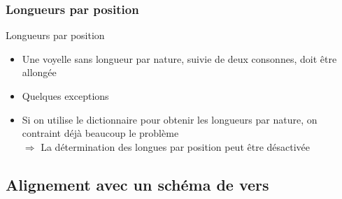 \documentclass{beamer}
\begin{document}
\subsubsection{Longueurs par position}

\begin{frame}{Longueurs par position}

\begin{itemize}
\item Une voyelle sans longueur par nature, suivie de deux consonnes, doit être allongée
\item Quelques exceptions
\vfill
\item Si on utilise le dictionnaire pour obtenir les longueurs par nature, on contraint déjà beaucoup le problème\\
$\Rightarrow$ La détermination des longues par position peut être désactivée
\end{itemize}
\end{frame} %


\subsection{Alignement avec un schéma de vers}
\end{document}
